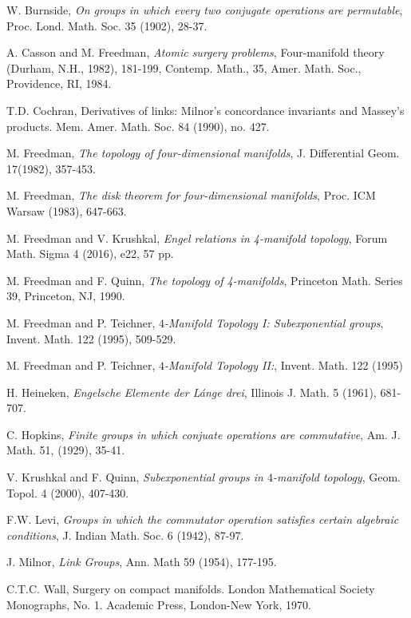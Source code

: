 \documentclass[12pt]{amsart}
\theoremstyle{definition}
\theoremstyle{remark}
\numberwithin{equation}{section}
\theoremstyle{plain}
\theoremstyle{definition}
\numberwithin{figure}{section}
\begin{document}
\begin{thebibliography}{10}

 W. Burnside, {\em On groups in which every two conjugate operations are permutable},
Proc. Lond. Math. Soc. 35 (1902), 28-37.


 A. Casson and M.  Freedman, {\em Atomic surgery problems}, Four-manifold theory (Durham, N.H., 1982), 181-199, Contemp. Math., 35, Amer. Math. Soc., Providence, RI, 1984.


 T.D. Cochran, Derivatives of links: Milnor's concordance invariants and Massey's products. Mem. Amer. Math. Soc. 84 (1990), no. 427.

 M. Freedman, {\em The topology of four-dimensional
manifolds}, J. Differential Geom. 17(1982), 357-453.


 M. Freedman, {\em The disk theorem for
four-dimensional manifolds}, Proc. ICM Warsaw (1983), 647-663.

 M. Freedman and V.  Krushkal, 
{\em Engel relations in 4-manifold topology},
Forum Math. Sigma 4 (2016), e22, 57 pp.

 M. Freedman and F. Quinn, {\em The topology of
4-manifolds}, Princeton Math. Series 39, Princeton, NJ, 1990.

 M. Freedman and P. Teichner,
{\em$4$-Manifold Topology I: Subexponential groups}, Invent. Math. 122 (1995), 509-529.

 M. Freedman and P. Teichner,
{\em$4$-Manifold Topology II:}, Invent. Math. 122 (1995)


 H. Heineken, 
{\em Engelsche Elemente der L\'{a}nge drei}, 
Illinois J. Math. 5 (1961), 681-707. 

 C. Hopkins, {\em Finite groups in which conjuate operations are commutative}, Am. J.
Math. 51, (1929), 35-41.


 V. Krushkal and F. Quinn, {\em Subexponential groups in
$4$-manifold topology}, Geom. Topol. 4 (2000), 407-430.

 F.W. Levi,
{\em Groups in which the commutator operation satisfies certain algebraic conditions}, 
J. Indian Math. Soc. 6 (1942), 87-97.


 J. Milnor, {\em Link Groups}, Ann. Math 59 (1954), 177-195.


 C.T.C. Wall, Surgery on compact manifolds. London Mathematical Society Monographs, No. 1. Academic Press, London-New York, 1970.




\end{thebibliography}
\end{document}
